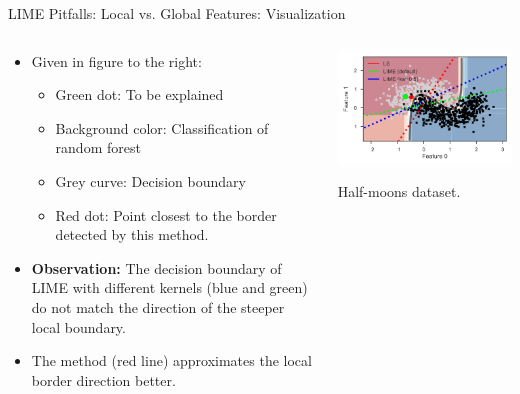 \documentclass[11pt,compress,t,notes=noshow, aspectratio=169, xcolor=table]{beamer}
\begin{document}
\begin{vbframe}{LIME Pitfalls: Local vs. Global Features: Visualization }

\begin{columns}
	\begin{column}{0.6\textwidth}
		\begin{itemize}
		\item Given in figure to the right:
		\begin{itemize}
		    \item Green dot: To be explained
		    \item Background color: Classification of random forest
		    \item Grey curve: Decision boundary
		    \item Red dot: Point closest to the border detected by this method. 
		\end{itemize}
		\item \textbf{Observation: }The decision boundary of LIME with different kernels (blue and green) do not match the direction of the steeper local boundary. 
		\item The method  (red line) approximates the local border direction better. 
	\end{itemize}
\end{column}
\begin{column}{0.39\textwidth}
\vspace{0.3cm}

	\begin{center}
	\includegraphics[width=1\textwidth]{figure/lime-globallocal2}
	
	\vspace{-0.3cm}
	{Half-moons dataset.}
	
\end{center}

	\end{column}
\end{columns}
\end{vbframe}
\end{document}
